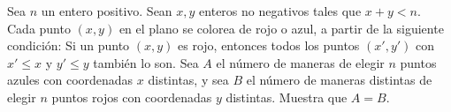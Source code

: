 Sea $n$ un entero positivo. Sean $x,y$ enteros no negativos tales que $x+y\lt n$. Cada punto $(x,y)$ en el plano se colorea de rojo o azul, a partir de la siguiente condición: Si un punto $(x,y)$ es rojo, entonces todos los puntos $(x',y')$ con $x'\leq x$ y $y'\leq y$ también lo son. Sea $A$ el número de maneras de elegir $n$ puntos azules con coordenadas $x$ distintas, y sea $B$ el número de maneras distintas de elegir $n$ puntos rojos con coordenadas $y$ distintas. Muestra que $A=B$.